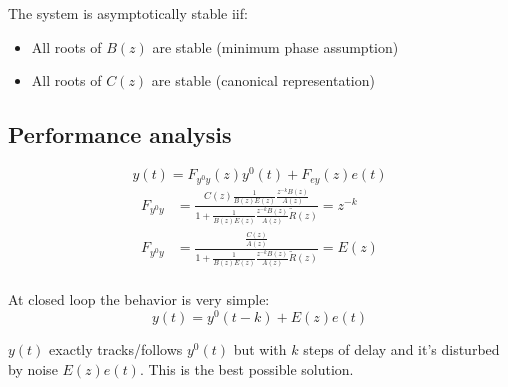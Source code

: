 The system is asymptotically stable iif:
\begin{itemize}
    \item All roots of $B(z)$ are stable (minimum phase assumption)
    \item All roots of $C(z)$ are stable (canonical representation)
\end{itemize}

\subsection{Performance analysis}

\[
    y(t) = F_{y^0y}(z)y^0(t) + F_{ey}(z)e(t)
\]
\begin{align*}
    F_{y^0y} &= \frac{ C(z) \frac{1}{B(z)E(z)}\frac{z^{-k}B(z)}{A(z)} }{1 + \frac{1}{B(z)E(z)}\frac{z^{-k}B(z)}{A(z)}\tilde{R}(z) } = z^{-k} \\
    F_{y^0y} &= \frac{ \frac{C(z)}{A(z)}}{1 + \frac{1}{B(z)E(z)}\frac{z^{-k}B(z)}{A(z)}\tilde{R}(z) } = E(z)\\
\end{align*}

At closed loop the behavior is very simple:
\[
    y(t) = y^0(t-k)+E(z)e(t)
\]

$y(t)$ exactly tracks/follows $y^0(t)$ but with $k$ steps of delay and it's disturbed by noise $E(z)e(t)$.
This is the best possible solution.

